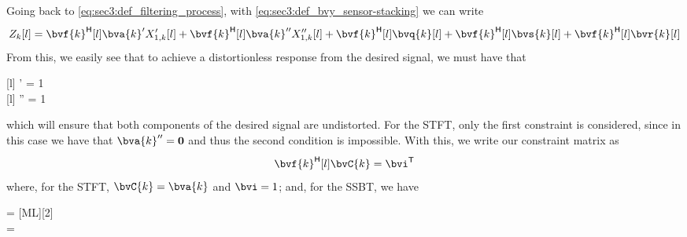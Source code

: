 Going back to \cref{eq:sec3:def_filtering_process}, with \cref{eq:sec3:def_bvy_sensor-stacking} we can write
\begin{equation}
	Z_{k}[l] = \he{\bvf{k}}[l] \bva{k}' X_{1,k}'[l] + \he{\bvf{k}}[l] \bva{k}'' X_{1,k}''[l] + \he{\bvf{k}}[l] \bvq{k}[l] + \he{\bvf{k}}[l] \bvs{k}[l] + \he{\bvf{k}}[l] \bvr{k}[l]
\end{equation}
From this, we easily see that to achieve a distortionless response from the desired signal, we must have that
\begin{subgather}
	 ' = 1 \\
	 '' = 1
\end{subgather}
which will ensure that both components of the desired signal are undistorted. For the STFT, only the first constraint is considered, since in this case we have that $\bva{k}'' = \bv{0}$ and thus the second condition is impossible. With this, we write our constraint matrix as
\begin{equation}
	\he{\bvf{k}}[l] \bvC{k} = \tr{\bvi}
\end{equation}
where, for the STFT, $\bvC{k} = \bva{k}$ and $\bvi = 1$; and, for the SSBT, we have
\begin{subgather}
	 = [ML][2] \\
	\bvi = 
\end{subgather}

